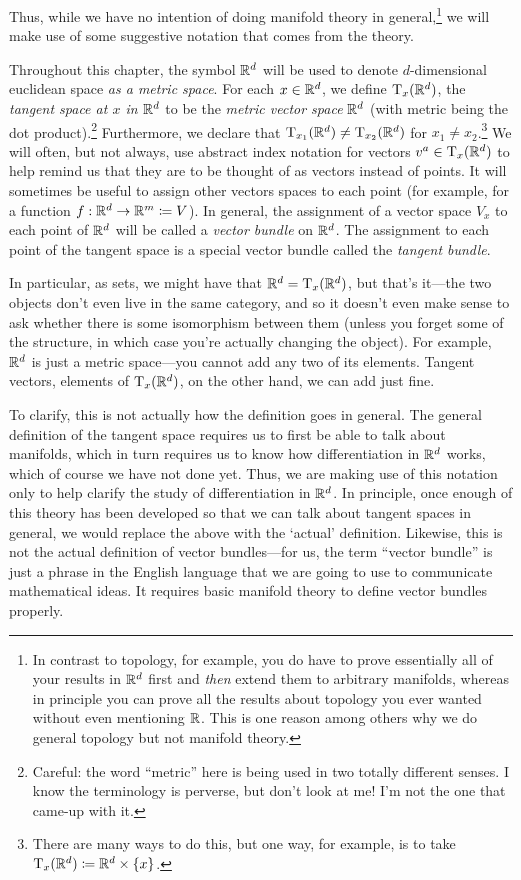 Thus, while we have no intention of doing manifold theory in general,\footnote{In contrast to topology, for example, you do have to prove essentially all of your results in $\R ^d$ first and \emph{then} extend them to arbitrary manifolds, whereas in principle you can prove all the results about topology you ever wanted without even mentioning $\R$.  This is one reason among others why we do general topology but not manifold theory.} we will make use of some suggestive notation that comes from the theory.
\begin{displayquote}
Throughout this chapter, the symbol $\R ^d$ will be used to denote $d$-dimensional euclidean space \emph{as a metric space}.  For each $x\in \R ^d$, we define $\tangent{\R ^d}{x}$, the \emph{tangent space at $x$ in $\R ^d$} to be the \emph{metric vector space} $\R ^d$ (with metric being the dot product).\footnote{Careful:  the word ``metric'' here is being used in two totally different senses.  I know the terminology is perverse, but don't look at me!  I'm not the one that came-up with it.}  Furthermore, we declare that $\tangent{\R ^d}{x_1}\neq \tangent{\R ^d}{x_2}$ for $x_1\neq x_2$.\footnote{There are many ways to do this, but one way, for example, is to take $\tangent{\R ^d}{x}\coloneqq \R ^d\times \{ x\}$.}  We will often, but not always, use abstract index notation for vectors $v^a\in \tangent{\R ^d}{x}$ to help remind us that they are to be thought of as vectors instead of points.  It will sometimes be useful to assign other vectors spaces to each point (for example, for a function $f:\R ^d\rightarrow \R ^m\coloneqq V$).  In general, the assignment of a vector space $V_x$ to each point of $\R ^d$ will be called a \emph{vector bundle} on $\R ^d$.  The assignment to each point of the tangent space is a special vector bundle called the \emph{tangent bundle}.
\end{displayquote}
In particular, as sets, we might have that $\R ^d=\tangent{\R ^d}{x}$, but that's it---the two objects don't even live in the same category, and so it doesn't even make sense to ask whether there is some isomorphism between them (unless you forget some of the structure, in which case you're actually changing the object).  For example, $\R ^d$ is just a metric space---you cannot add any two of its elements.  Tangent vectors, elements of $\tangent{\R ^d}{x}$, on the other hand, we can add just fine.

To clarify, this is not actually how the definition goes in general.  The general definition of the tangent space requires us to first be able to talk about manifolds, which in turn requires us to know how differentiation in $\R ^d$ works, which of course we have not done yet.  Thus, we are making use of this notation only to help clarify the study of differentiation in $\R ^d$.  In principle, once enough of this theory has been developed so that we can talk about tangent spaces in general, we would replace the above with the `actual' definition.  Likewise, this is not the actual definition of vector bundles---for us, the term ``vector bundle'' is just a phrase in the English language that we are going to use to communicate mathematical ideas.  It requires basic manifold theory to define vector bundles properly.

